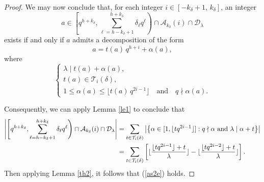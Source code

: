 \documentclass[journal,onecolumn]{IEEEtran}
\begin{document}
\begin{proof}
We may now conclude that, for each integer 
$i \in [-k_{\delta}+1,\, k_{\delta}]$, an integer
\[
a \in \left[q^{h+k_{\delta}}, \sum_{\ell=h-k_{\delta}+1}^{h+k_{\delta}}
\delta_{\ell} q^{\ell}\right)
\cap \mathcal{A}_{k_{\delta}}(i) \cap \mathcal{D}_{\lambda}
\]
exists if and only if $a$ admits a decomposition of the form
\[
a = t(a)\, q^{h+i} + \alpha(a),
\]
where
\[
\begin{cases}
\lambda \mid t(a) + \alpha(a),\\
t(a) \in \mathcal{T}_i(\delta),\\
1 \le \alpha(a) \le \lfloor t(a)\, q^{2i-1} \rfloor
\quad \text{and} \quad q \nmid \alpha(a).
\end{cases}
\]



Consequently, we can apply Lemma \ref{le1} to conclude  that 
\begin{equation}\notag
\begin{split}
\left| \left[q^{h+k_{\delta}},  \sum\limits_{\ell=h-k_{\delta}+1}^{h+k_{\delta}}\delta_{\ell}q^{\ell}\right)\cap \mathcal{A}_{k_{\delta}}(i)\cap \mathcal{D}_{\lambda}\right|& =\sum\limits_{t\in \mathcal{T}_i(\delta)}\left| \left\{ \alpha\in [1, \lfloor tq^{2i-1} \rfloor]: q\nmid \alpha \hbox{ and }\lambda\mid \alpha + t      \right\}\right|\\
&=\sum\limits_{t\in \mathcal{T}_i(\delta)}\left[\lfloor \frac{\lfloor tq^{2i-1}\rfloor+t}{\lambda}\rfloor -\lfloor \frac{\lfloor tq^{2i-2}\rfloor+t}{\lambda}\rfloor\right].
\end{split}
\end{equation}
Then applying Lemma  \ref{th2}, it follows that (\ref{as2e}) holds. 


\end{proof}
\end{document}
